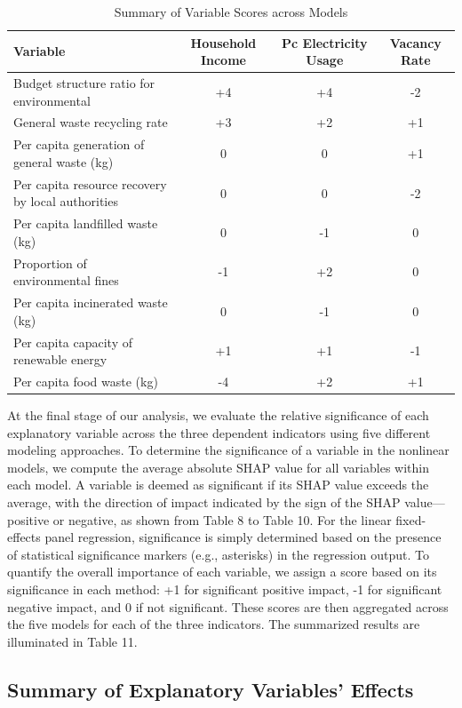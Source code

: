 \documentclass{article}
\begin{document}
\begin{table}[H]
\centering
\begin{tabular}{lccc}
\toprule
\textbf{Variable} & \textbf{Household Income} & \textbf{Pc Electricity Usage} & \textbf{Vacancy Rate} \\
\midrule
Budget structure ratio for environmental & +4 & +4 & -2 \\
General waste recycling rate             & +3 & +2 & +1 \\
Per capita generation of general waste (kg) & 0 & 0 & +1 \\
Per capita resource recovery by local authorities & 0 & 0 & -2 \\
Per capita landfilled waste (kg)         & 0 & -1 & 0 \\
Proportion of environmental fines        & -1 & +2 & 0 \\
Per capita incinerated waste (kg)        & 0 & -1 & 0 \\
Per capita capacity of renewable energy  & +1 & +1 & -1 \\
Per capita food waste (kg)               & -4 & +2 & +1 \\
\bottomrule
\end{tabular}
\caption{Summary of Variable Scores across Models }
\end{table}

At the final stage of our analysis, we evaluate the relative significance of each explanatory variable across the three dependent indicators using five different modeling approaches.
To determine the significance of a variable in the nonlinear models, we compute the average absolute SHAP value for all variables within each model. 
A variable is deemed as significant if its SHAP value exceeds the average, with the direction of impact indicated by the sign of the SHAP value—positive or negative, as shown from Table 8 to Table 10.
For the linear fixed-effects panel regression, significance is simply determined based on the presence of statistical significance markers (e.g., asterisks) in the regression output.
To quantify the overall importance of each variable, we assign a score based on its significance in each method: +1 for significant positive impact, -1 for significant negative impact, and 0 if not significant. These scores are then aggregated across the five models for each of the three indicators.
The summarized results are illuminated in Table 11.
\\
\subsection{Summary of Explanatory Variables' Effects}
\end{document}
